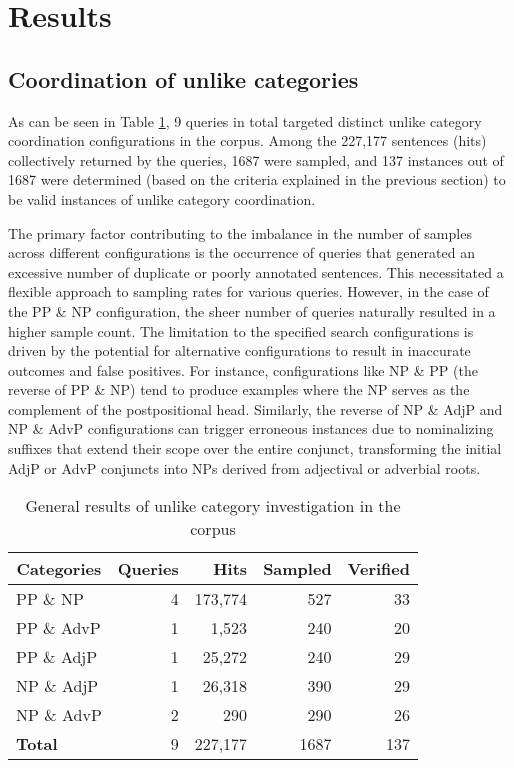 \section{Results} \label{sec:corpusresults}

\subsection{Coordination of unlike categories}

As can be seen in Table \ref{CAT-corpus-general-table}, 9 queries in total targeted distinct unlike category coordination configurations in the corpus. Among the 227,177 sentences (hits) collectively returned by the queries, 1687 were sampled, and 137 instances out of 1687 were determined (based on the criteria explained in the previous section) to be valid instances of unlike category coordination.

The primary factor contributing to the imbalance in the number of samples across different configurations is the occurrence of queries that generated an excessive number of duplicate or poorly annotated sentences. This necessitated a flexible approach to sampling rates for various queries. However, in the case of the PP \& NP configuration, the sheer number of queries naturally resulted in a higher sample count. The limitation to the specified search configurations is driven by the potential for alternative configurations to result in inaccurate outcomes and false positives. For instance, configurations like NP \& PP (the reverse of PP \& NP) tend to produce examples where the NP serves as the complement of the postpositional head. Similarly, the reverse of NP \& AdjP and NP \& AdvP configurations can trigger erroneous instances due to nominalizing suffixes that extend their scope over the entire conjunct, transforming the initial AdjP or AdvP conjuncts into NPs derived from adjectival or adverbial roots.

\begin{table}[!h]
	\centering
	\begin{tabular}{lrrrr}
		\multicolumn{1}{c}{\textbf{Categories}} & \textbf{Queries} & \textbf{Hits} & \textbf{Sampled} & \textbf{Verified} \\ \hline \hline
		PP \& NP       & 4 & 173,774 & 527  & 33  \\
		PP \& AdvP     & 1 & 1,523  & 240  & 20  \\
		PP \& AdjP     & 1 & 25,272 & 240  & 29  \\
		NP \& AdjP     & 1 & 26,318 & 390  & 29  \\
		NP \& AdvP     & 2 & 290    & 290  & 26  \\ \hline \hline
		\textbf{Total} & 9 & 227,177 & 1687 & 137
	\end{tabular}
	\caption{General results of unlike category investigation in the corpus}
	\label{CAT-corpus-general-table}
\end{table}


